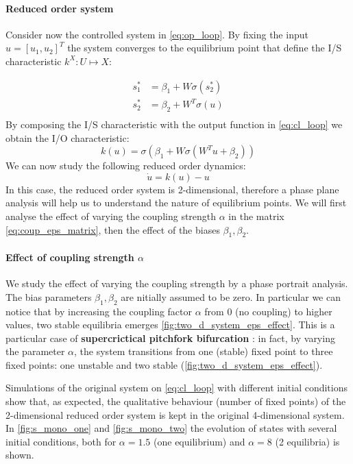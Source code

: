\paragraph{Reduced order system} 
Consider now the controlled system in \eqref{eq:op_loop}. By fixing the input $u = [u_1, u_2]^T$ the system converges to the equilibrium point that define  the I/S characteristic $k^X: U \mapsto X$:

\begin{equation}
    \begin{aligned}
    s_1^* &=  \beta_1 + W\sigma(s_2^*)\\
    s_2^* &=  \beta_2 + W^T\sigma(u)\\
    \end{aligned}
\end{equation}
By composing the I/S characteristic with the output function in \eqref{eq:cl_loop} we obtain the I/O characteristic:
\begin{equation}
    k(u) = \sigma(\beta_1 + W\sigma(W^Tu + \beta_2))
    \label{eq:reduced_2d}
\end{equation}
We can now study the following reduced order dynamics:
\begin{equation}
    \dot{u} = k(u) - u
    \label{eq:reduced_2d}
\end{equation}
In this case, the reduced order system is 2-dimensional, therefore a phase plane analysis will help us to understand the nature of equilibrium points. We will first analyse the effect of varying the coupling strength $\alpha$ in the matrix \eqref{eq:coup_eps_matrix}, then the effect of the biases $\beta_1,\beta_2$.

\paragraph{Effect of coupling strength $\alpha$} We study the effect of varying the coupling strength by a phase portrait analysis. The bias parameters $ \beta_1, \beta_2$ are nitially assumed to be zero. In particular we can notice that by increasing the coupling factor $ \alpha $ from 0 (no coupling) to higher values, two stable equilibria emerges \cref{fig:two_d_system_eps_effect}. This is a particular case of \textbf{supercrictical pitchfork bifurcation} \cite{StrogatzNonlinear}: in fact, by varying the parameter $\alpha$, the system transitions from one (stable) fixed point to three fixed points: one unstable and two stable (\cref{fig:two_d_system_eps_effect}). 

Simulations of the original system on \eqref{eq:cl_loop} with different initial conditions show that, as expected, the qualitative behaviour (number of fixed points) of the 2-dimensional reduced order system is kept in the original 4-dimensional system. In \cref{fig:s_mono_one} and \cref{fig:s_mono_two} the evolution of states with several initial conditions, both for $\alpha=1.5$ (one equilibrium) and $\alpha=8$ (2 equilibria) is shown.

